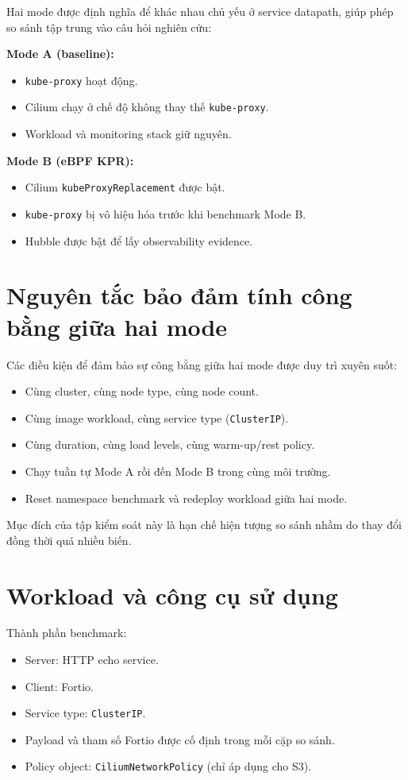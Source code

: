 Hai mode được định nghĩa để khác nhau chủ yếu ở service datapath, giúp phép so sánh tập trung vào câu hỏi nghiên cứu:

\textbf{Mode A (baseline):}
\begin{itemize}
  \item \texttt{kube-proxy} hoạt động.
  \item Cilium chạy ở chế độ không thay thế \texttt{kube-proxy}.
  \item Workload và monitoring stack giữ nguyên.
\end{itemize}

\textbf{Mode B (eBPF KPR):}
\begin{itemize}
  \item Cilium \texttt{kubeProxyReplacement} được bật.
  \item \texttt{kube-proxy} bị vô hiệu hóa trước khi benchmark Mode B.
  \item Hubble được bật để lấy observability evidence.
\end{itemize}

\section{Nguyên tắc bảo đảm tính công bằng giữa hai mode}
\label{sec:fairness-two-modes}

Các điều kiện để đảm bảo sự công bằng giữa hai mode được duy trì xuyên suốt:
\begin{itemize}
  \item Cùng cluster, cùng node type, cùng node count.
  \item Cùng image workload, cùng service type (\texttt{ClusterIP}).
  \item Cùng duration, cùng load levels, cùng warm-up/rest policy.
  \item Chạy tuần tự Mode A rồi đến Mode B trong cùng môi trường.
  \item Reset namespace benchmark và redeploy workload giữa hai mode.
\end{itemize}

Mục đích của tập kiểm soát này là hạn chế hiện tượng so sánh nhầm do thay đổi đồng thời quá nhiều biến.

\section{Workload và công cụ sử dụng}
\label{sec:workload-toolchain}

Thành phần benchmark:
\begin{itemize}
  \item Server: HTTP echo service.
  \item Client: Fortio.
  \item Service type: \texttt{ClusterIP}.
  \item Payload và tham số Fortio được cố định trong mỗi cặp so sánh.
  \item Policy object: \texttt{CiliumNetworkPolicy} (chỉ áp dụng cho S3).
\end{itemize}

